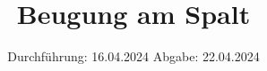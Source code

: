 

\subject{V406}
\title{Beugung am Spalt}
\date{%
  Durchführung: 16.04.2024
  \hspace{3em}
  Abgabe: 22.04.2024
}



\maketitle
\thispagestyle{empty}
\tableofcontents
\newpage






\printbibliography{}


